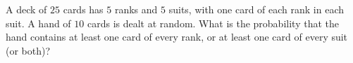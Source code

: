 A deck of $25$ cards has $5$ ranks and $5$ suits, with one card of each rank in each suit. A hand of $10$ cards is dealt at random. What is the probability that the hand contains at least one card of every rank, or at least one card of every suit (or both)?

